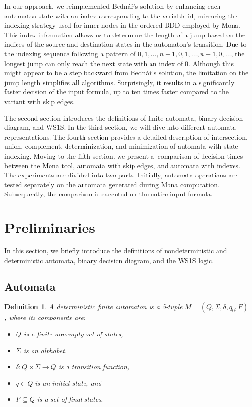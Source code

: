 \documentclass[pdflatex,sn-mathphys-num]{sn-jnl}%
\theoremstyle{thmstyleone}%
\theoremstyle{thmstyletwo}%
\theoremstyle{thmstylethree}%
\newtheorem{definition}{Definition}%
\begin{document}
    In our approach, we reimplemented Bednář's solution by enhancing each automaton state with an index corresponding to the variable id, mirroring the indexing strategy used for inner nodes in the ordered BDD employed by Mona. This index information allows us to determine the length of a jump based on the indices of the source and destination states in the automaton's transition. Due to the indexing sequence following a pattern of $0, 1, \dots, n-1, 0, 1, \dots, n-1, 0, \dots$, the longest jump can only reach the next state with an index of $0$. Although this might appear to be a step backward from Bednář's solution, the limitation on the jump length simplifies all algorithms. Surprisingly, it results in a significantly faster decision of the input formula, up to ten times faster compared to the variant with skip edges.

    The second section introduces the definitions of finite automata, binary decision diagram, and WS1S. In the third section, we will dive into different automata representations. The fourth section provides a detailed description of intersection, union, complement, determinization, and minimization of automata with state indexing. Moving to the fifth section, we present a~comparison of decision times between the Mona tool, automata with skip edges, and automata with indexes. The experiments are divided into two parts. Initially, automata operations are tested separately on the automata generated during Mona computation. Subsequently, the comparison is executed on the entire input formula.


\section{Preliminaries}
    In this section, we briefly introduce the definitions of nondeterministic and deterministic automata, binary decision diagram, and the WS1S logic.

    \subsection{Automata}

        \begin{definition}
            A deterministic finite automaton is a 5-tuple $M = (Q, \Sigma, \delta, q_0, F)$, where its components are:
            \begin{itemize}[noindent]
                \item $Q$ is a finite nonempty set of states,
                \item $\Sigma$ is an alphabet,
                \item $\delta : Q \times \Sigma \rightarrow Q$ is a transition function,
                \item $q \in Q$ is an initial state, and
                \item $F \subseteq Q$ is a set of final states.
            \end{itemize}
        \end{definition}
\end{document}
